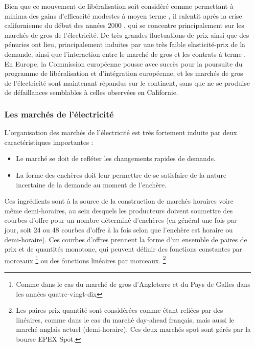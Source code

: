 Bien que ce mouvement de libéralisation soit considéré comme permettant à minima des gains d'efficacité modestes à moyen terme \cite{fabrizio2007markets}, il ralentit après la crise californienne du début des années 2000 \cite{jamasb2005electricity}, qui se concentre principalement sur les marchés de gros de l'électricité. De très grandes fluctuations de prix ainsi que des pénuries ont lieu, principalement induites par une très faible elasticité-prix de la demande, ainsi que l'interaction entre le marché de gros et les contrats à terme \cite{borenstein2002trouble}. En Europe, la Commission européenne pousse avec succès pour la poursuite du programme de libéralisation et d'intégration européenne, et les marchés de gros de l'électricité sont maintenant répandus sur le continent, sans que ne se produise de défaillances semblables à celles observées en Californie. 

\subsubsection*{Les marchés de l'électricité}
L'organisation des marchés de l'électricité est très fortement induite par deux caractéristiques importantes :
\begin{itemize}
\item Le marché se doit de refléter les changements rapides de demande.
\item La forme des enchères doit leur permettre de se satisfaire de la nature incertaine de la demande au moment de l'enchère.
\end{itemize}

Ces ingrédients sont à la source de la construction de marchés horaires voire même demi-horaires, au sein desquels les producteurs doivent soumettre des courbes d'offre pour un nombre déterminé d'enchères (en général une fois par jour, soit 24 ou 48 courbes d'offre à la fois selon que l'enchère est horaire ou demi-horaire). Ces courbes d'offres prennent la forme d'un ensemble de paires de prix et de quantités monotone, qui peuvent définir des fonctions constantes par morceaux \footnote{Comme dans le cas du marché de gros d'Angleterre et du Pays de Galles dans les années quatre-vingt-dix} ou des fonctions linéaires par morceaux. \footnote{Les paires prix quantité sont considérées comme étant reliées par des linéaires, comme dans le cas du marché day-ahead français, mais aussi le marché anglais actuel (demi-horaire). Ces deux marchés spot sont gérés par la bourse EPEX Spot.}\\

